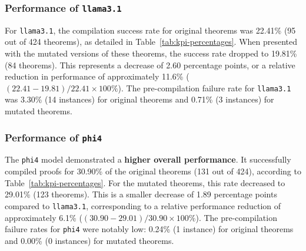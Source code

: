 \subsubsection{Performance of \texttt{llama3.1}}
\label{sssec:results_llama31}
For \texttt{llama3.1}, the compilation success rate for original theorems was 22.41\% (95 out of 424 theorems), as detailed in Table~\ref{tab:kpi-percentages}. When presented with the mutated versions of these theorems, the success rate dropped to 19.81\% (84 theorems). This represents a decrease of 2.60 percentage points, or a relative reduction in performance of approximately 11.6\% ($ (22.41 - 19.81) / 22.41 \times 100\% $). The pre-compilation failure rate for \texttt{llama3.1} was 3.30\% (14 instances) for original theorems and 0.71\% (3 instances) for mutated theorems.

\subsubsection{Performance of \texttt{phi4}}
\label{sssec:results_phi4}
The \texttt{phi4} model demonstrated a \textbf{higher overall performance}. It successfully compiled proofs for 30.90\% of the original theorems (131 out of 424), according to Table~\ref{tab:kpi-percentages}. For the mutated theorems, this rate decreased to 29.01\% (123 theorems). This is a smaller decrease of 1.89 percentage points compared to \texttt{llama3.1}, corresponding to a relative performance reduction of approximately 6.1\% ($ (30.90 - 29.01) / 30.90 \times 100\% $). The pre-compilation failure rates for \texttt{phi4} were notably low: 0.24\% (1 instance) for original theorems and 0.00\% (0 instances) for mutated theorems.

